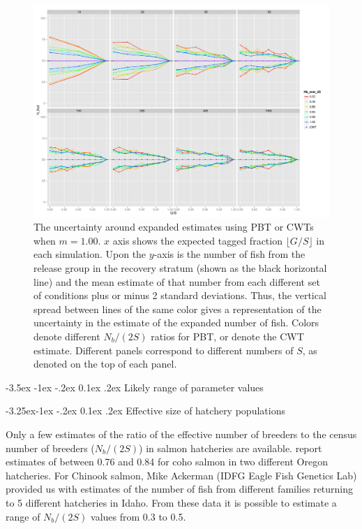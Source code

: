 \documentclass[11pt]{article}
\makeatletter
\renewcommand\section{\@startsection {section}{1}{\z@}%
                                   {-3.5ex \@plus -1ex \@minus -.2ex}%
                                   {0.1ex \@plus.2ex}%
                                   {\normalfont\large\bfseries}}
\renewcommand\subsection{\@startsection{subsection}{2}{\z@}%
                                     {-3.25ex\@plus -1ex \@minus -.2ex}%
                                     {0.1ex \@plus .2ex}%
                                     {\normalfont\normalsize\bfseries}}
\makeatother
\begin{document}
\begin{figure}
\includegraphics[width = .93\textwidth]{./images/sd_line_horns_m_1.pdf}
\caption{The uncertainty around expanded estimates using PBT or CWTs when $m = 1.00$.  $x$ axis shows the
expected tagged fraction $\lfloor G/S \rfloor$ in each simulation. Upon the $y$-axis is the number of fish from the
release group in the recovery stratum (shown as the black horizontal line) and the mean estimate of that number from each different set of 
conditions plus or minus 2 standard deviations.  Thus, the vertical spread between lines of the same color gives a representation
of the uncertainty in the estimate of the expanded number of fish. Colors denote different $N_b/(2S)$ ratios for PBT, or denote
the CWT estimate.  Different
panels correspond to different numbers of $S$, as denoted on the top of each panel.
\label{fig:horn1.0}}
\end{figure}



\section{Likely range of parameter values}

\subsection{Effective size of hatchery populations}

Only a few estimates of the ratio of the effective number of breeders to the census number of breeders ($N_b/(2S)$) in salmon
hatcheries are available.  \citet{Moyeretal2007} report estimates of between 0.76 and 0.84 for coho salmon in two different 
Oregon hatcheries.  For Chinook salmon, Mike Ackerman (IDFG Eagle Fish Genetics Lab) provided us
with estimates of the number of fish from different
families returning to 5 different
hatcheries in Idaho.  From these data it is possible to estimate a range of $N_b/(2S)$ values from 0.3 to 0.5.
\end{document}
